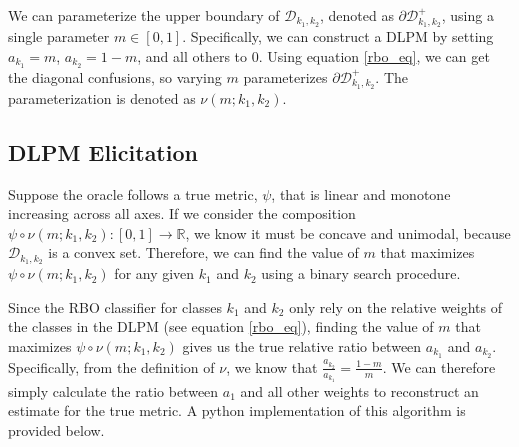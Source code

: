 \documentclass[
  letterpaper,
  numbers=noenddot,
  DIV=11,
  oneside]{scrreprt}
\theoremstyle{remark}
\begin{document}
We can parameterize the upper boundary of \(\mathcal{D}_{k_1, k_2}\),
denoted as \(\partial \mathcal{D}^{+}_{k_1, k_2}\), using a single
parameter \(m \in [0, 1]\). Specifically, we can construct a DLPM by
setting \(a_{k_1} = m\), \(a_{k_2} = 1 - m\), and all others to 0. Using
equation \hyperref[rbo_eq]{{[}rbo\_eq{]}}, we can get the diagonal
confusions, so varying \(m\) parameterizes
\(\partial \mathcal{D}^{+}_{k_1, k_2}\). The parameterization is denoted
as \(\nu(m; k_1, k_2)\).

\subsection{DLPM Elicitation}\label{dlpm-elicitation}

Suppose the oracle follows a true metric, \(\psi\), that is linear and
monotone increasing across all axes. If we consider the composition
\(\psi \circ \nu(m; k_1, k_2): [0, 1] \rightarrow \mathbb{R}\), we know
it must be concave and unimodal, because \(\mathcal{D}_{k_1, k_2}\) is a
convex set. Therefore, we can find the value of \(m\) that maximizes
\(\psi \circ \nu(m; k_1, k_2)\) for any given \(k_1\) and \(k_2\) using
a binary search procedure.

Since the RBO classifier for classes \(k_1\) and \(k_2\) only rely on
the relative weights of the classes in the DLPM (see equation
\hyperref[rbo_eq]{{[}rbo\_eq{]}}), finding the value of \(m\) that
maximizes \(\psi \circ \nu(m; k_1, k_2)\) gives us the true relative
ratio between \(a_{k_1}\) and \(a_{k_2}\). Specifically, from the
definition of \(\nu\), we know that
\(\frac{a_{k_2}}{a_{k_1}} = \frac{1-m}{m}\). We can therefore simply
calculate the ratio between \(a_1\) and all other weights to reconstruct
an estimate for the true metric. A python implementation of this
algorithm is provided below.
\end{document}

